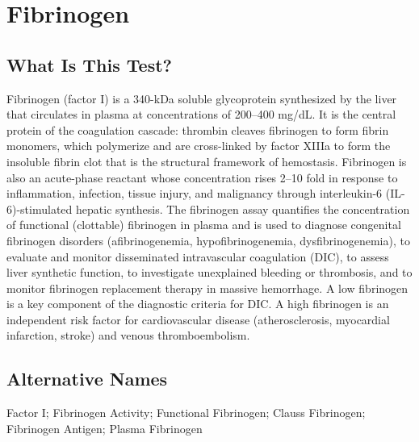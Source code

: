 \chapter{Fibrinogen}

\section*{What Is This Test?}
Fibrinogen (factor I) is a 340-kDa soluble glycoprotein synthesized by the liver that circulates in plasma at concentrations of 200--400 mg/dL. It is the central protein of the coagulation cascade: thrombin cleaves fibrinogen to form fibrin monomers, which polymerize and are cross-linked by factor XIIIa to form the insoluble fibrin clot that is the structural framework of hemostasis. Fibrinogen is also an acute-phase reactant whose concentration rises 2--10 fold in response to inflammation, infection, tissue injury, and malignancy through interleukin-6 (IL-6)-stimulated hepatic synthesis. The fibrinogen assay quantifies the concentration of functional (clottable) fibrinogen in plasma and is used to diagnose congenital fibrinogen disorders (afibrinogenemia, hypofibrinogenemia, dysfibrinogenemia), to evaluate and monitor disseminated intravascular coagulation (DIC), to assess liver synthetic function, to investigate unexplained bleeding or thrombosis, and to monitor fibrinogen replacement therapy in massive hemorrhage. A low fibrinogen is a key component of the diagnostic criteria for DIC. A high fibrinogen is an independent risk factor for cardiovascular disease (atherosclerosis, myocardial infarction, stroke) and venous thromboembolism.

\section*{Alternative Names}
Factor I; Fibrinogen Activity; Functional Fibrinogen; Clauss Fibrinogen; Fibrinogen Antigen; Plasma Fibrinogen

